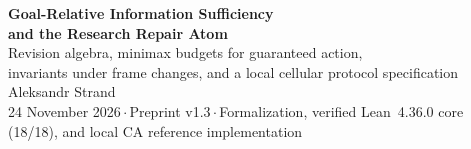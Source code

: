 \documentclass[11pt,a4paper]{article}
\theoremstyle{preprintthm}
\theoremstyle{preprintdef}
\begin{document}
\thispagestyle{plain}
\begin{center}
  {\LARGE\bfseries Goal-Relative Information Sufficiency\\[3pt]
  and the Research Repair Atom}\\[10pt]
  {\large\color{muted} Revision algebra, minimax budgets for guaranteed action,\\
  invariants under frame changes, and a local cellular protocol specification}\\[12pt]
  {\normalsize Aleksandr Strand}\\[4pt]
  {\small\color{muted} 24 November 2026\,$\cdot$\,Preprint v1.3\,$\cdot$\,Formalization, verified Lean~4.36.0 core (18/18), and local CA reference implementation}
\end{center}

\vspace{4pt}
\end{document}
